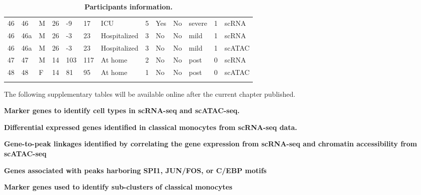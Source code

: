 \documentclass{book}
\begin{document}
\begin{refsection}
\begin{landscape}
\begin{longtable}{p{0.7cm}p{0.7cm}p{0.5cm}p{0.75cm}p{0.75cm}p{0.75cm}p{1.75cm}p{0.8cm}p{0.75cm}p{1cm}p{0.75cm}p{1cm}p{0.75cm}}
    46 & 46  & M & 26 & -9  & 17  & ICU                                                & 5 & Yes & No  & severe & 1 & scRNA \\
    46 & 46a & M & 26 & -3  & 23  & Hospitalized                                       & 3 & No  & No  & mild   & 1 & scRNA \\
    46 & 46a & M & 26 & -3  & 23  & Hospitalized                                       & 3 & No  & No  & mild   & 1 & scATAC \\
    47 & 47  & M & 14 & 103 & 117 & At home                                            & 2 & No  & No  & post   & 0 & scRNA \\
    48 & 48  & F & 14 & 81  & 95  & At home                                            & 1 & No  & No  & post   & 0 & scATAC \\
    \hline
    \caption{\label{tab:chp6suptab1}
    \textbf{Participants information.}
  }
  \end{longtable}

\normalsize
The following supplementary tables will be available online after the current chapter published.
\begin{table}[H]
  \caption{\label{tab:chp6suptab2}
  \textbf{Marker genes to identify cell types in scRNA-seq and scATAC-seq.}
}
\end{table}

\vspace{-3em}
\begin{table}[H]
  \caption{\label{tab:chp6suptab3}
  \textbf{Differential expressed genes identified in classical monocytes from scRNA-seq data.}
}
\end{table}

\vspace{-3em}
\begin{table}[H]
  \caption{\label{tab:chp6suptab4}
  \textbf{Gene-to-peak linkages identified by correlating the gene expression from scRNA-seq and chromatin accessibility from scATAC-seq}
}
\end{table}

\vspace{-3em}
\begin{table}[H]
  \caption{\label{tab:chp6suptab5}
  \textbf{Genes associated with peaks harboring SPI1, JUN/FOS, or C/EBP motifs}
}
\end{table}

\vspace{-3em}
\begin{table}[H]
  \caption{\label{tab:chp6suptab6}
  \textbf{Marker genes used to identify sub-clusters of classical monocytes}
}
\end{table}


\end{landscape}
\end{refsection}
\end{document}
